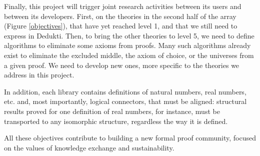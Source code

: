 Finally, this project will trigger joint research activities between
its users and between its developers.  First, on the theories in the
second half of the array (Figure \ref{objectives}), that have yet
reached level 1, and that we still need to express in {\sf
  Dedukti}. Then, to bring the other theories to level 5, we need to
define algorithms to eliminate some axioms from proofs. Many such
algorithms already exist to eliminate the excluded middle, the axiom
of choice, or the universes from a given proof. We need to develop new
ones, more specific to the theories we address in this project.

In addition, each library contains definitions of natural numbers,
real numbers, etc. and, most importantly, logical connectors, that
must be aligned: structural results proved for one definition of real
numbers, for instance, must be transported to any isomorphic structure, 
regardless the way it is defined.

All these objectives contribute to building a new formal proof
community, focused on the values of knowledge exchange and
sustainability.


